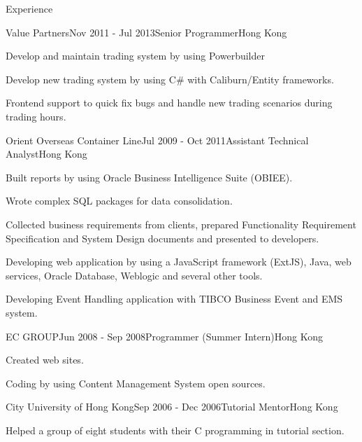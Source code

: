 \documentclass{resume} %
\begin{document}
\begin{rSection}{Experience}

\begin{rSubsection}{Value Partners}{Nov 2011 - Jul 2013}{Senior Programmer}{Hong Kong}
\item Develop and maintain trading system by using Powerbuilder
\item Develop new trading system by using C\# with Caliburn/Entity frameworks.
\item Frontend support to quick fix bugs and handle new trading scenarios during trading hours.
\end{rSubsection}


\begin{rSubsection}{Orient Overseas Container Line}{Jul 2009 - Oct 2011}{Assistant Technical Analyst}{Hong Kong}
\item Built reports by using Oracle Business Intelligence Suite (OBIEE).
\item Wrote complex SQL packages for data consolidation.
\item Collected business requirements from clients, prepared Functionality Requirement Specification and System Design documents and presented to developers.
\item Developing web application by using a JavaScript framework (ExtJS), Java, web services, Oracle Database, Weblogic and several other tools.
\item Developing Event Handling application with TIBCO Business Event and EMS system.
\end{rSubsection}


\begin{rSubsection}{EC GROUP}{Jun 2008 - Sep 2008}{Programmer (Summer Intern)}{Hong Kong}
\item Created web sites.
\item Coding by using Content Management System open sources.
\end{rSubsection}


\begin{rSubsection}{City University of Hong Kong}{Sep 2006 - Dec 2006}{Tutorial Mentor}{Hong Kong}
\item Helped a group of eight students with their C programming in tutorial section.
\end{rSubsection}

\end{rSection}
\end{document}
